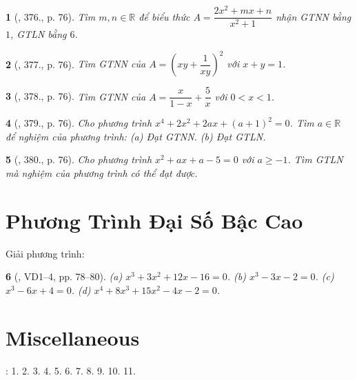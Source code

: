 \documentclass{article}
\newtheorem{baitoan}{}
\begin{document}
\begin{baitoan}[\cite{Binh_Toan_9_tap_2}, 376., p. 76]
	Tìm $m,n\in\mathbb{R}$ để biểu thức $A = \dfrac{2x^2 + mx + n}{x^2 + 1}$ nhận {\rm GTNN} bằng $1$, {\rm GTLN} bằng $6$.
\end{baitoan}

\begin{baitoan}[\cite{Binh_Toan_9_tap_2}, 377., p. 76]
	Tìm {\rm GTNN} của $A = \left(xy + \dfrac{1}{xy}\right)^2$ với $x + y = 1$.
\end{baitoan}

\begin{baitoan}[\cite{Binh_Toan_9_tap_2}, 378., p. 76]
	Tìm {\rm GTNN} của $A = \dfrac{x}{1 - x} + \dfrac{5}{x}$ với $0 < x < 1$.
\end{baitoan}

\begin{baitoan}[\cite{Binh_Toan_9_tap_2}, 379., p. 76]
	Cho phương trình $x^4 + 2x^2 + 2ax + (a + 1)^2 = 0$. Tìm $a\in\mathbb{R}$ để nghiệm của phương trình: (a) Đạt {\rm GTNN}. (b) Đạt {\rm GTLN}.
\end{baitoan}

\begin{baitoan}[\cite{Binh_Toan_9_tap_2}, 380., p. 76]
	Cho phương trình $x^2 + ax + a - 5 = 0$ với $a\ge-1$. Tìm {\rm GTLN} mà nghiệm của phương trình có thể đạt được.
\end{baitoan}


\section{Phương Trình Đại Số Bậc Cao}
Giải phương trình:

\begin{baitoan}[\cite{Binh_Toan_9_tap_2}, VD1--4, pp. 78--80]
	(a) $x^3 + 3x^2 + 12x - 16 = 0$. (b) $x^3 - 3x - 2 = 0$. (c) $x^3 - 6x + 4 = 0$. (d) $x^4 + 8x^3 + 15x^2 - 4x - 2 = 0$.
\end{baitoan}


\section{Miscellaneous}
\cite[BTCCVII, \S3, pp. 66--67]{SGK_Toan_9_Canh_Dieu_tap_2}: 1. 2. 3. 4. 5. 6. 7. 8. 9. 10. 11.
\end{document}
